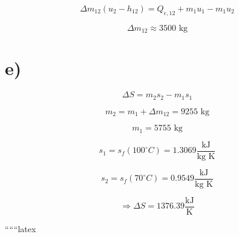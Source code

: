 \[
\Delta m_{12} (u_2 - h_{12}) = Q_{e,12} + m_1 u_1 - m_1 u_2
\]

\[
\Delta m_{12} \approx 3500 \text{ kg}
\]

\section*{e)}

\[
\Delta S = m_2 s_2 - m_1 s_1
\]

\[
m_2 = m_1 + \Delta m_{12} = 9255 \text{ kg}
\]

\[
m_1 = 5755 \text{ kg}
\]

\[
s_1 = s_f (100^\circ C) = 1.3069 \frac{\text{kJ}}{\text{kg K}}
\]

\[
s_2 = s_f (70^\circ C) = 0.9549 \frac{\text{kJ}}{\text{kg K}}
\]

\[
\Rightarrow \Delta S = 1376.39 \frac{\text{kJ}}{\text{K}}
\]

``````latex


